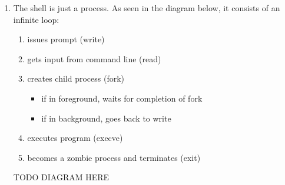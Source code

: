 \documentclass[12pt]{article}
\begin{document}
\begin{enumerate}
    \item The shell is just a process. As seen in the diagram below, it consists of an infinite loop:
    \begin{enumerate}[1.]
        \item issues prompt (write)
        \item gets input from command line (read)
        \item creates child process (fork)
        \begin{itemize}
            \item if in foreground, waits for completion of fork
            \item if in background, goes back to write
        \end{itemize}
        \item executes program (execve)
        \item becomes a zombie process and terminates (exit)
    \end{enumerate}
    TODO DIAGRAM HERE
\end{enumerate}
\end{document}
